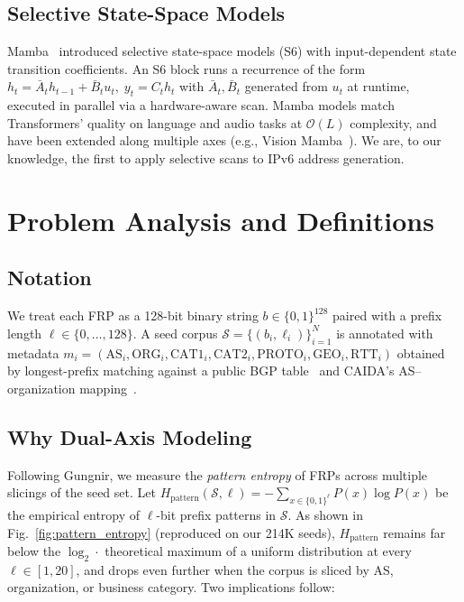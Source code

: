 \documentclass[conference]{IEEEtran}
\begin{document}
\subsection{Selective State-Space Models}
Mamba~\cite{gu2023mamba} introduced selective state-space models
(S6) with input-dependent state transition coefficients.  An S6 block
runs a recurrence of the form $h_t = \bar A_t h_{t-1} + \bar B_t u_t,
\; y_t = C_t h_t$ with $\bar A_t, \bar B_t$ generated from $u_t$ at
runtime, executed in parallel via a hardware-aware scan.  Mamba models
match Transformers' quality on language and audio tasks at $\mathcal
O(L)$ complexity, and have been extended along multiple axes (e.g.,
Vision Mamba~\cite{zhu2024vimamba}).  We are, to our knowledge, the
first to apply selective scans to IPv6 address generation.

\section{Problem Analysis and Definitions}\label{sec:problem}

\subsection{Notation}
We treat each FRP as a 128-bit binary string $b\in\{0,1\}^{128}$ paired
with a prefix length $\ell\in\{0,\dots,128\}$.  A seed corpus $\mathcal
S=\{(b_i,\ell_i)\}_{i=1}^N$ is annotated with metadata
$m_i=(\text{AS}_i, \text{ORG}_i, \text{CAT1}_i, \text{CAT2}_i,
\text{PROTO}_i, \text{GEO}_i, \text{RTT}_i)$ obtained by longest-prefix
matching against a public BGP table~\cite{routeviews} and CAIDA's
AS--organization mapping~\cite{caida-as2org}.

\subsection{Why Dual-Axis Modeling}
Following Gungnir, we measure the
\emph{pattern entropy} of FRPs across multiple slicings of the seed
set.  Let $H_{\text{pattern}}(\mathcal S, \ell) =
-\sum_{x\in\{0,1\}^{\ell}} P(x)\log P(x)$ be the empirical entropy of
$\ell$-bit prefix patterns in $\mathcal S$.  As shown in
Fig.~\ref{fig:pattern_entropy} (reproduced on our 214K seeds),
$H_{\text{pattern}}$ remains far below the $\log_2 \cdot$ theoretical
maximum of a uniform distribution at every $\ell\in[1,20]$, and drops
even further when the corpus is sliced by AS, organization, or business
category.  Two implications follow:
\end{document}
